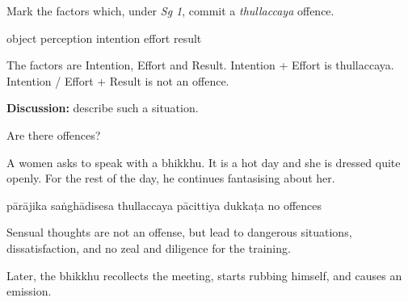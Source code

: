 \begin{exam}{\autoExamName}
\problemDivide

\begin{problem}

  Mark the factors which, under \textit{Sg 1}, commit a \textit{thullaccaya} offence.

  \begin{answers}{6}
    \bChoices
     object\eAns
     perception\eAns
     intention\eAns
     effort\eAns
     result\eAns
    \eChoices
  \end{answers}

  \bigskip

  \begin{solution}
    The factors are Intention, Effort and Result. Intention + Effort is
    thullaccaya. Intention / Effort + Result is not an offence.
  \end{solution}

  \textbf{Discussion:} describe such a situation.

\end{problem}

\problemDivide

\begin{problem*}

  Are there offences?

\begin{parts}

\item
  A women asks to speak with a bhikkhu.
  It is a hot day and she is dressed quite openly.
  For the rest of the day, he continues fantasising about her.

  \bigskip

  \begin{answers}{6}
    \bChoices
     pārājika\eAns
     saṅghādisesa\eAns
     thullaccaya\eAns
     pācittiya\eAns
     dukkaṭa\eAns
     no offences\eAns
    \eChoices
  \end{answers}

  \begin{solution}
    Sensual thoughts are not an offense, but lead to dangerous situations,
    dissatisfaction, and no zeal and diligence for the training.
  \end{solution}

  \bigskip

  \item Later, the bhikkhu recollects the meeting, starts rubbing himself, and causes an emission.

  \bigskip


\end{parts}
\end{problem*}
\end{exam}
